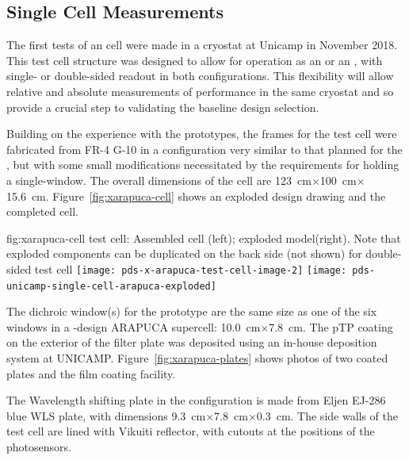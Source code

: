 \subsection{Single Cell  Measurements}
\label{sec:xarapuca-unicamp}

The first tests of an  cell were made in a cryostat at Unicamp in November 2018. This test cell structure was designed to allow for operation as an  or an , with single- or double-sided readout in both configurations.  This flexibility will allow relative and absolute measurements of performance in the same cryostat and so provide a crucial step to validating the baseline design selection.

Building on the experience with the  prototypes, the frames for the test cell were fabricated from FR-4 G-10 in a configuration very similar to that planned for the , but with some small modifications necessitated by the requirements for holding a single-window. The overall dimensions of the cell are \SI{123}{cm}$\times$\SI{100}{cm}$\times$\SI{15.6}{cm}. Figure~\ref{fig:xarapuca-cell} shows an exploded design drawing and the completed cell. 

\begin{dunefigure}{fig:xarapuca-cell}
{ test cell:  Assembled cell (left); exploded model(right).  Note that exploded components can be duplicated on the back side (not shown) for double-sided test cell} 
	\texttt{[image: pds-x-arapuca-test-cell-image-2]}
	\texttt{[image: pds-unicamp-single-cell-arapuca-exploded]}
\end{dunefigure}

The dichroic window(s) for the prototype are the same size as one of the six windows in a -design ARAPUCA supercell: \SI{10.0}{cm}$\times$\SI{7.8}{cm}.  The pTP coating on the exterior of the filter plate was deposited using an in-house deposition system at UNICAMP. Figure~\ref{fig:xarapuca-plates} shows photos of two coated plates and the film coating facility. 

The Wavelength shifting plate in the  configuration is made from Eljen EJ-286 blue WLS plate, with dimensions \SI{9.3}{cm}$\times$\SI{7.8}{cm}$\times$\SI{0.3}{cm}.  The side walls of the test cell are lined with Vikuiti reflector, with cutouts at the positions of the photosensors.

